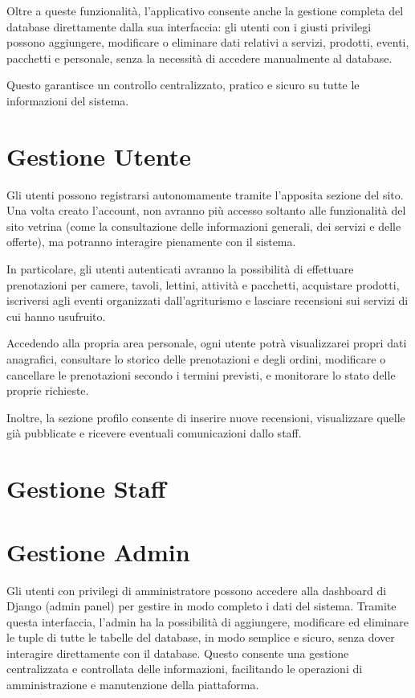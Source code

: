 \documentclass[a4paper,12pt]{report}
\begin{document}
Oltre a queste funzionalità, l'applicativo consente anche la gestione completa del database
direttamente dalla sua interfaccia: gli utenti con i giusti privilegi possono aggiungere,
modificare o eliminare dati relativi a servizi, prodotti, eventi, pacchetti e personale, senza
la necessità di accedere manualmente al database.

Questo garantisce un controllo centralizzato, pratico e sicuro su tutte le informazioni del sistema.

\section{Gestione Utente}
Gli utenti possono registrarsi autonomamente tramite l'apposita sezione del sito. Una volta creato
l'account, non avranno più accesso soltanto alle funzionalità del sito vetrina (come la consultazione
delle informazioni generali, dei servizi e delle offerte), ma potranno interagire pienamente con il
sistema.

In particolare, gli utenti autenticati avranno la possibilità di effettuare prenotazioni per
camere, tavoli, lettini, attività e pacchetti, acquistare prodotti, iscriversi agli eventi
organizzati dall'agriturismo e lasciare recensioni sui servizi di cui hanno usufruito.

Accedendo alla propria area personale, ogni utente potrà visualizzarei propri dati anagrafici, consultare
lo storico delle prenotazioni e degli ordini, modificare o cancellare le prenotazioni secondo i termini
previsti, e monitorare lo stato delle proprie richieste.

Inoltre, la sezione profilo consente di inserire
nuove recensioni, visualizzare quelle già pubblicate e ricevere eventuali comunicazioni dallo staff.

\section{Gestione Staff}

\section{Gestione Admin}
Gli utenti con privilegi di amministratore possono accedere alla dashboard di Django (admin panel)
per gestire in modo completo i dati del sistema. Tramite questa interfaccia, l'admin ha la
possibilità di aggiungere, modificare ed eliminare le tuple di tutte le tabelle del database, in modo
semplice e sicuro, senza dover interagire direttamente con il database. Questo consente una gestione
centralizzata e controllata delle informazioni, facilitando le operazioni di amministrazione e manutenzione
della piattaforma.
\end{document}
